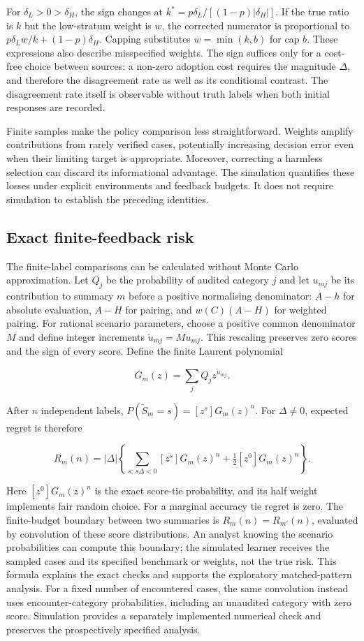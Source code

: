 \documentclass[
  british,
  11pt,
]{article}
\begin{document}
For \(\delta_L>0>\delta_H\), the sign changes at
\(k^*=p\delta_L/[(1-p)|\delta_H|]\). If the true ratio is \(k\) but the
low-stratum weight is \(w\), the corrected numerator is proportional to
\(p\delta_L w/k+(1-p)\delta_H\). Capping substitutes \(w=\min(k,b)\) for
cap \(b\). These expressions also describe misspecified weights. The
sign suffices only for a cost-free choice between sources: a non-zero
adoption cost requires the magnitude \(\Delta\), and therefore the
disagreement rate as well as its conditional contrast. The disagreement
rate itself is observable without truth labels when both initial
responses are recorded.

Finite samples make the policy comparison less straightforward. Weights
amplify contributions from rarely verified cases, potentially increasing
decision error even when their limiting target is appropriate. Moreover,
correcting a harmless selection can discard its informational advantage.
The simulation quantifies these losses under explicit environments and
feedback budgets. It does not require simulation to establish the
preceding identities.

\subsection{Exact finite-feedback
risk}\label{exact-finite-feedback-risk}

The finite-label comparisons can be calculated without Monte Carlo
approximation. Let \(Q_j\) be the probability of audited category \(j\)
and let \(u_{mj}\) be its contribution to summary \(m\) before a
positive normalising denominator: \(A-h\) for absolute evaluation,
\(A-H\) for pairing, and \(w(C)(A-H)\) for weighted pairing. For
rational scenario parameters, choose a positive common denominator \(M\)
and define integer increments \(\tilde u_{mj}=M u_{mj}\). This rescaling
preserves zero scores and the sign of every score. Define the finite
Laurent polynomial

\[G_m(z)=\sum_j Q_j z^{\tilde u_{mj}}.\]

After \(n\) independent labels, \(P(\tilde S_m=s)=[z^s]G_m(z)^n\). For
\(\Delta\ne0\), expected regret is therefore

\[R_m(n)=|\Delta|\left\{\sum_{s:\,s\Delta<0}[z^s]G_m(z)^n+\tfrac12[z^0]G_m(z)^n\right\}.\]

Here \([z^0]G_m(z)^n\) is the exact score-tie probability, and its half
weight implements fair random choice. For a marginal accuracy tie regret
is zero. The finite-budget boundary between two summaries is
\(R_m(n)=R_{m'}(n)\), evaluated by convolution of these score
distributions. An analyst knowing the scenario probabilities can compute
this boundary; the simulated learner receives the sampled cases and its
specified benchmark or weights, not the true risk. This formula explains
the exact checks and supports the exploratory matched-pattern analysis.
For a fixed number of encountered cases, the same convolution instead
uses encounter-category probabilities, including an unaudited category
with zero score. Simulation provides a separately implemented numerical
check and preserves the prospectively specified analysis.
\end{document}
